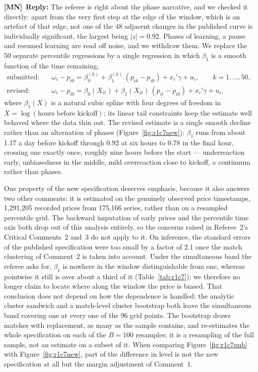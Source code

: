 \documentclass[letterpaper,12pt]{article}
\newcounter{b}
\newcommand{\ReplyMN}[1]{\par\noindent%
  \textcolor{mncol}{\textbf{[MN]}}~\textbf{Reply:} #1}
\begin{document}
\begin{enumerate}
\ReplyMN{The referee is right about the phase narrative, and we checked it directly: apart from the very first step at the edge of the window, which is an artefact of that edge, not one of the 48 adjacent changes in the published curve is individually significant, the largest being $|z| = 0.92$. Phases of learning, a pause and resumed learning are read off noise, and we withdraw them. We replace the 50 separate percentile regressions by a single regression in which $\beta_1$ is a smooth function of the time remaining,
\begin{align*}
\text{submitted:} \quad & \omega_i - p_{i0} = \beta_0^{(k)} + \beta_1^{(k)} \, (p_{ik} - p_{i0}) + x_i' \gamma + u_i, \qquad k = 1, \dots, 50, \\
\text{revised:} \quad & \omega_i - p_{i0} = \beta_0(X_{it}) + \beta_1(X_{it}) \, (p_{it} - p_{i0}) + x_i' \gamma + u_i,
\end{align*}
where $\beta_1(X)$ is a natural cubic spline with four degrees of freedom in $X = \log(\text{hours before kickoff})$; its linear tail constraints keep the estimate well behaved where the data thin out. The revised estimate is a single smooth decline rather than an alternation of phases (Figure~\ref{fig:r1c7new}): $\beta_1$ runs from about 1.17 a day before kickoff through 0.92 at six hours to 0.78 in the final hour, crossing one exactly once, roughly nine hours before the start --- underreaction early, unbiasedness in the middle, mild overreaction close to kickoff, a continuum rather than phases.

One property of the new specification deserves emphasis, because it also answers two other comments: it is estimated on the genuinely observed price timestamps, 1{,}291{,}205 recorded prices from 175{,}166 series, rather than on a resampled percentile grid. The backward imputation of early prices and the percentile time axis both drop out of this analysis entirely, so the concerns raised in Referee~2's Critical Comments~2 and~3 do not apply to it. On inference, the standard errors of the published specification were too small by a factor of 2.1 once the match clustering of Comment~2 is taken into account. Under the simultaneous band the referee asks for, $\beta_1$ is nowhere in the window distinguishable from one, whereas pointwise it still is over about a third of it (Table~\ref{tab:r1c7}); we therefore no longer claim to locate where along the window the price is biased. That conclusion does not depend on how the dependence is handled: the analytic cluster sandwich and a match-level cluster bootstrap both leave the simultaneous band covering one at every one of the 96 grid points. The bootstrap draws matches with replacement, as many as the sample contains, and re-estimates the whole specification on each of the $B = 100$ resamples; it is a resampling of the full sample, not an estimate on a subset of it. When comparing Figure~\ref{fig:r1c7pub} with Figure~\ref{fig:r1c7new}, part of the difference in level is not the new specification at all but the margin adjustment of Comment~1.

}
\end{enumerate}
\end{document}
